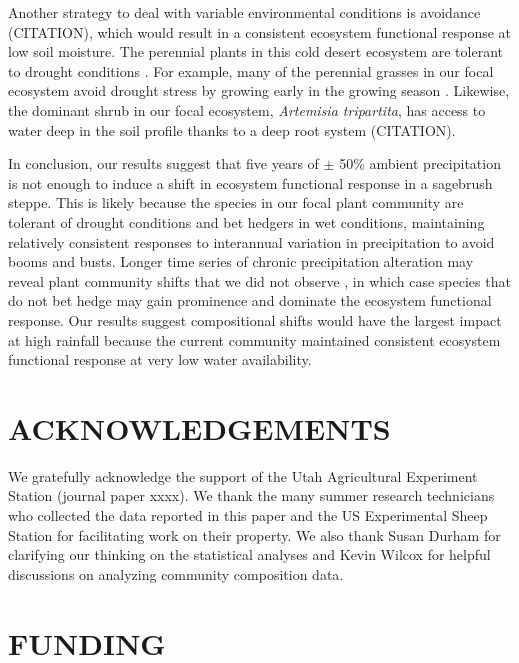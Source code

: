 \documentclass[fleqn,10pt,lineno]{wlpeerj} %
\begin{document}
Another strategy to deal with variable environmental conditions is
avoidance (CITATION), which would result in a consistent ecosystem
functional response at low soil moisture. The perennial plants in this
cold desert ecosystem are tolerant to drought conditions \citep[A.R.
Kleinhesselink, unpublished data]{Bazzaz1979, Franks2011}. For example,
many of the perennial grasses in our focal ecosystem avoid drought
stress by growing early in the growing season \citep[A.R.
Kleinhesselink, personal observation]{Blaisdell1958}. Likewise, the
dominant shrub in our focal ecosystem, \emph{Artemisia tripartita}, has
access to water deep in the soil profile thanks to a deep root system
(CITATION).

In conclusion, our results suggest that five years of \(\pm\) 50\%
ambient precipitation is not enough to induce a shift in ecosystem
functional response in a sagebrush steppe. This is likely because the
species in our focal plant community are tolerant of drought conditions
and bet hedgers in wet conditions, maintaining relatively consistent
responses to interannual variation in precipitation to avoid booms and
busts. Longer time series of chronic precipitation alteration may reveal
plant community shifts that we did not observe
\citep[e.g.,][]{Wilcox2016}, in which case species that do not bet hedge
may gain prominence and dominate the ecosystem functional response. Our
results suggest compositional shifts would have the largest impact at
high rainfall because the current community maintained consistent
ecosystem functional response at very low water availability.

\section{ACKNOWLEDGEMENTS}\label{acknowledgements}

We gratefully acknowledge the support of the Utah Agricultural
Experiment Station (journal paper xxxx). We thank the many summer
research technicians who collected the data reported in this paper and
the US Experimental Sheep Station for facilitating work on their
property. We also thank Susan Durham for clarifying our thinking on the
statistical analyses and Kevin Wilcox for helpful discussions on
analyzing community composition data.

\section{FUNDING}\label{funding}
\end{document}
